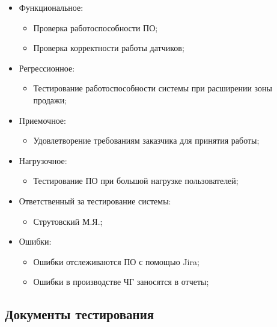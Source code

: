 \documentclass[a4paper,10pt]{article}
\begin{document}
        \begin{itemize}
            \item Функциональное:
                \begin{itemize}
                \item Проверка работоспособности ПО;
                \item Проверка корректности работы датчиков;
                \end{itemize}
            \item Регрессионное:
                \begin{itemize}
                    \item Тестирование работоспособности системы при расширении зоны продажи;
                \end{itemize}

            \item Приемочное:
                \begin{itemize}
                    \item Удовлетворение требованиям заказчика для принятия работы;
                \end{itemize}

            \item Нагрузочное:
                \begin{itemize}
                    \item Тестирование ПО при большой нагрузке пользователей;
                \end{itemize}

            \item Ответственный за тестирование системы:
                \begin{itemize}
                    \item Струтовский М.Я.;
                \end{itemize}
            \item Ошибки:
                \begin{itemize}
                    \item Ошибки отслеживаются ПО с помощью Jira;
                    \item Ошибки в производстве ЧГ заносятся в отчеты;
                \end{itemize}

        \end{itemize}

    \subsection{Документы тестирования}
\end{document}
